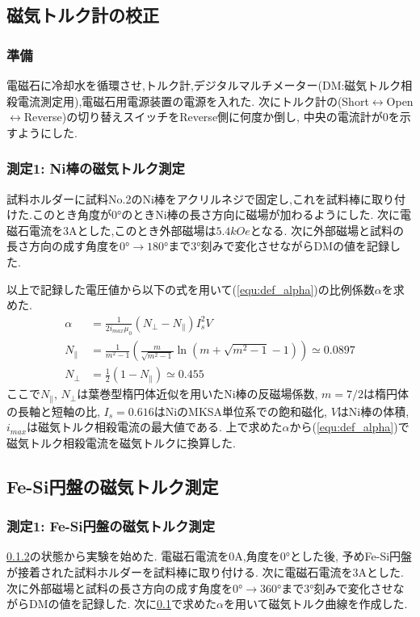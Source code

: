 \subsection{磁気トルク計の校正}
\label{subsec:torque_adjust}
\subsubsection{準備}
\label{subsubsec:torque_junbi}
電磁石に冷却水を循環させ,トルク計,デジタルマルチメーター(DM:磁気トルク相殺電流測定用),電磁石用電源装置の電源を入れた.
次にトルク計の(Short$\leftrightarrow$Open$\leftrightarrow$Reverse)の切り替えスイッチをReverse側に何度か倒し,
中央の電流計が0を示すようにした.
\subsubsection{測定1: Ni棒の磁気トルク測定}
\label{subsubsec:torque_adjust}
試料ホルダーに試料No.2のNi棒をアクリルネジで固定し,これを試料棒に取り付けた.このとき角度が$0\si{\degree}$のときNi棒の長さ方向に磁場が加わるようにした.
次に電磁石電流を$3\si{\ampere}$とした,このとき外部磁場は$5.4\si{kOe}$となる.
次に外部磁場と試料の長さ方向の成す角度を$0\si{\degree}\rightarrow180\si{\degree}$まで$3\si{\degree}$刻みで変化させながらDMの値を記録した.

以上で記録した電圧値から以下の式を用いて(\ref{equ:def_alpha})の比例係数$\alpha$を求めた.
\begin{align}
  \label{equ:calc_alpha}
  \alpha&=\frac{1}{2i_{max}\mu_0}(N_{\perp}-N_{\parallel})I_s^2V\\
  N_{\parallel}&=\frac{1}{m^2-1}\left(\frac{m}{\sqrt{m^2-1}}\ln(m+\sqrt{m^2-1}-1)\right)\simeq0.0897\\
  N_{\perp}&=\frac{1}{2}(1-N_{\parallel})\simeq0.455
\end{align}
ここで$N_{\parallel}$, $N_{\perp}$は葉巻型楕円体近似を用いたNi棒の反磁場係数, $m=7/2$は楕円体の長軸と短軸の比, 
$I_s=0.616$はNiのMKSA単位系での飽和磁化, $V$はNi棒の体積, $i_{max}$は磁気トルク相殺電流の最大値である.
上で求めた$\alpha$から(\ref{equ:def_alpha})で磁気トルク相殺電流を磁気トルクに換算した.
\subsection{Fe-Si円盤の磁気トルク測定}
\subsubsection{測定1: Fe-Si円盤の磁気トルク測定}
\label{subsubsec:Fe-Si}
\ref{subsubsec:torque_adjust}の状態から実験を始めた.
電磁石電流を$0\si{\ampere}$,角度を$0\si{\degree}$とした後,
予めFe-Si円盤が接着された試料ホルダーを試料棒に取り付ける.
次に電磁石電流を$3\si{\ampere}$とした.
次に外部磁場と試料の長さ方向の成す角度を$0\si{\degree}\rightarrow360\si{\degree}$まで$3\si{\degree}$刻みで変化させながらDMの値を記録した.
次に\ref{subsec:torque_adjust}で求めた$\alpha$を用いて磁気トルク曲線を作成した.